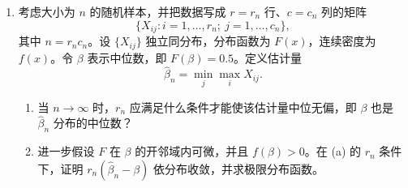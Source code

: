 \documentclass[UTF8,12pt]{ctexart}
\begin{document}
\begin{enumerate}[label=\textbf{\arabic*.},leftmargin=2.2em]
令 \(\mathcal X\) 为所有 \(p\) 个候选协变量集合，\(\alpha_0\subset\mathcal X\) 为恰好包含所有影响 \(Y\) 的重要协变量的子集（对应 \(\beta_j\ne0\)）。设 \(\alpha\) 为 \(\mathcal X\) 的任一子集，\(\beta(\alpha)\) 为 \(\beta\) 中对应于 \(\alpha\) 的分量。令
\[
\mathcal A=\{\alpha:\alpha_0\subset \alpha\}
\]
为所有包含全部重要协变量的模型集合。假设：
\begin{enumerate}[label=\textbf{(\Roman*)},leftmargin=2.4em]
\item 存在正常数 \(C_1,C_2\)，使得当 \(n\) 充分大时，
\[
C_1<\lambda_{\min}\{n^{-1}H_n(\beta)\}
\le \lambda_{\max}\{n^{-1}H_n(\beta)\}<C_2.
\]
\item 对任意给定 \(\varepsilon>0\)，存在 \(\delta>0\)，使得当 \(n\) 充分大时，对所有 \(\alpha\in\mathcal A\) 以及满足
\[
\|\widetilde\beta-\beta(\alpha)\|\le\delta
\]
的 \(\widetilde\beta\)，都有矩阵不等式
\[
(1-\varepsilon)H_n(\beta(\alpha))
\le H_n(\widetilde\beta)
\le (1+\varepsilon)H_n(\beta(\alpha)).
\]
\end{enumerate}
对任意模型 \(\alpha\)，令 \(\hat\beta_\alpha\) 为该模型下 \(\beta(\alpha)\) 的 MLE。证明
\[
\max_{\alpha\in\mathcal A}\|\hat\beta_\alpha-\beta(\alpha)\|
=O_p(n^{-1/3}).
\]

\item 考虑大小为 \(n\) 的随机样本，并把数据写成 \(r=r_n\) 行、\(c=c_n\) 列的矩阵
\[
\{X_{ij}:i=1,\ldots,r_n;\ j=1,\ldots,c_n\},
\]
其中 \(n=r_nc_n\)。设 \(\{X_{ij}\}\) 独立同分布，分布函数为 \(F(x)\)，连续密度为 \(f(x)\)。令 \(\beta\) 表示中位数，即 \(F(\beta)=0.5\)。定义估计量
\[
\hat\beta_n=\min_j\max_i X_{ij}.
\]
\begin{enumerate}[label=\textbf{(\alph*)},leftmargin=2.4em]
\item 当 \(n\to\infty\) 时，\(r_n\) 应满足什么条件才能使该估计量中位无偏，即 \(\beta\) 也是 \(\hat\beta_n\) 分布的中位数？
\item 进一步假设 \(F\) 在 \(\beta\) 的开邻域内可微，并且 \(f(\beta)>0\)。在 (a) 的 \(r_n\) 条件下，证明 \(r_n(\hat\beta_n-\beta)\) 依分布收敛，并求极限分布函数。
\end{enumerate}
\end{enumerate}
\end{document}
